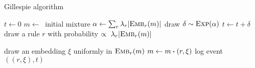 \begin{algorithm}
\caption{Gillespie algorithm}\label{alg:gillespie}
\begin{spacing}{1.2}
\begin{algorithmic}
\vspace{0.2cm}
  \STATE $t \gets 0$
  \STATE $m \gets\ $ initial mixture
      \STATE $\alpha \gets \sum_r {\lambda_r |{\textsc{Emb}}_{r}(m)|}$
      \STATE draw $\delta \sim \textsc{Exp}(\alpha) $
      \STATE $t \gets t + \delta$
      \STATE draw a rule $r$ with probability
      $\propto \ \lambda_r |{\textsc{Emb}}_{r}(m)|$

      \STATE draw an embedding $\xi$ uniformly in ${\textsc{Emb}}_{r}(m)$
      \STATE $m \gets \UPDATE{m}{(r, \xi)}$
      \STATE log event $((r, \xi), t)$
  \ENDWHILE
\vspace{0.1cm}
\end{algorithmic}
\end{spacing}
\end{algorithm}